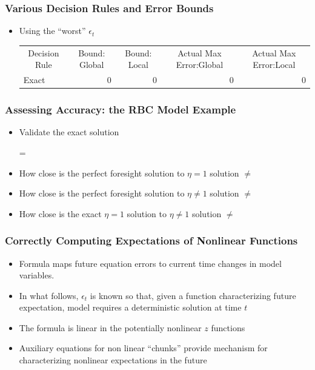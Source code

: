 \documentclass[letter]{beamer}
\begin{document}
\begin{frame}
  \frametitle{Various Decision Rules and Error Bounds}

  \begin{itemize}
  \item Using the ``worst'' $\epsilon_t$
  
  \begin{tabular}{|l|r|r|r|r|}
    \multicolumn{1}{|c|}{Decision Rule}&
    \multicolumn{1}{|c|}{Bound: Global}&
    \multicolumn{1}{|c|}{Bound: Local}&
    \multicolumn{1}{|c|}{Actual Max Error:Global}&
    \multicolumn{1}{|c|}{Actual Max Error:Local}\\
Exact&0&0&0&0\\
  \end{tabular}

  \end{itemize}

\end{frame}


\begin{frame}
  \frametitle{Assessing Accuracy: the RBC Model Example}
  \begin{itemize}
  \item Validate the exact solution

 =
  \item How close is the perfect foresight solution to $\eta=1$ solution
 $\ne$
  \item How close is the perfect foresight solution to $\eta \ne 1$ solution
 $\ne$
  \item How close is the exact $\eta=1$  solution to $\eta \ne 1$ solution
 $\ne$
  \end{itemize}
\end{frame}

\begin{frame}
  \frametitle{Correctly Computing Expectations of Nonlinear Functions}

  \begin{itemize}
  \item Formula maps future equation errors  to current time changes in model
variables.
\item In what follows, $\epsilon_t$ is known so that,
given a function characterizing future expectation,  model requires
a deterministic solution at time $t$
\item The formula is linear in the potentially nonlinear $z$ functions
\item Auxiliary equations for non linear ``chunks'' provide mechanism for characterizing  nonlinear expectations in the future
  \end{itemize}
\end{frame}
\end{document}
